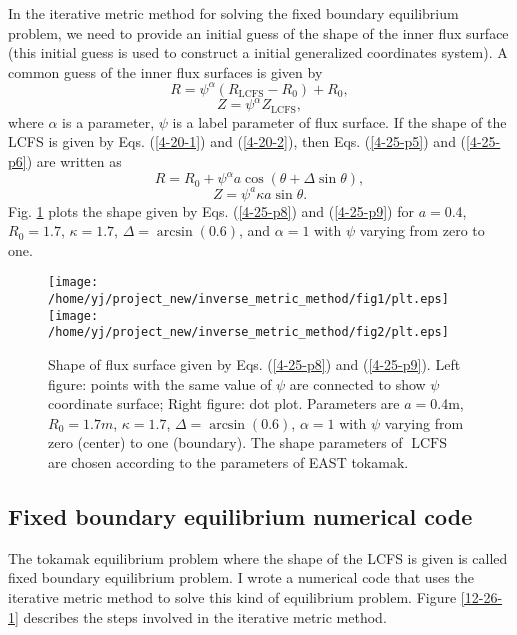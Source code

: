 \documentclass{llncs}
\newcommand{\tmop}[1]{\ensuremath{\operatorname{#1}}}
\begin{document}
In the iterative metric method{\cite{delucia1980}} for solving the fixed
boundary equilibrium problem, we need to provide an initial guess of the shape
of the inner flux surface (this initial guess is used to construct a initial
generalized coordinates system). A common guess of the inner flux surfaces is
given by
\begin{equation}
  \label{4-25-p5} R = \psi^{\alpha} (R_{\tmop{LCFS}} - R_0) + R_0,
\end{equation}
\begin{equation}
  \label{4-25-p6} Z = \psi^{\alpha} Z_{\tmop{LCFS}},
\end{equation}
where $\alpha$ is a parameter, $\psi$ is a label parameter of flux surface. If
the shape of the LCFS is given by Eqs. (\ref{4-20-1}) and (\ref{4-20-2}), then
Eqs. (\ref{4-25-p5}) and (\ref{4-25-p6}) are written as
\begin{equation}
  \label{4-25-p8} R = R_0 + \psi^{\alpha} a \cos (\theta + \Delta \sin
  \theta),
\end{equation}
\begin{equation}
  \label{4-25-p9} Z = \psi^a \kappa a \sin \theta .
\end{equation}
Fig. \ref{4-25-p10} plots the shape given by Eqs. (\ref{4-25-p8}) and
(\ref{4-25-p9}) for $a =$0.4, $R_0 = 1.7$, $\kappa = 1.7$, $\Delta = \arcsin
(0.6)$, and $\alpha = 1$ with $\psi$ varying from zero to one.

\begin{figure}[h]
  \texttt{[image: /home/yj/project\_new/inverse\_metric\_method/fig1/plt.eps]}\texttt{[image: /home/yj/project\_new/inverse\_metric\_method/fig2/plt.eps]}
  \caption{ \label{4-25-p10}Shape of flux surface given by Eqs.
  (\ref{4-25-p8}) and (\ref{4-25-p9}). Left figure: points with the same value
  of $\psi$ are connected to show $\psi$ coordinate surface; Right figure: dot
  plot. Parameters are $a =$0.4m, $R_0 = 1.7 m$, $\kappa = 1.7$, $\Delta =
  \arcsin (0.6)$, $\alpha = 1$ with $\psi$ varying from zero (center) to one
  (boundary). The shape parameters of $\tmop{LCFS}$ are chosen according to
  the parameters of EAST tokamak.}
\end{figure}

\subsection{Fixed boundary equilibrium numerical code}

The tokamak equilibrium problem where the shape of the LCFS is given is called
fixed boundary equilibrium problem. I wrote a numerical code that uses the
iterative metric method{\cite{delucia1980}} to solve this kind of equilibrium
problem. Figure \ref{12-26-1} describes the steps involved in the iterative
metric method.
\end{document}
